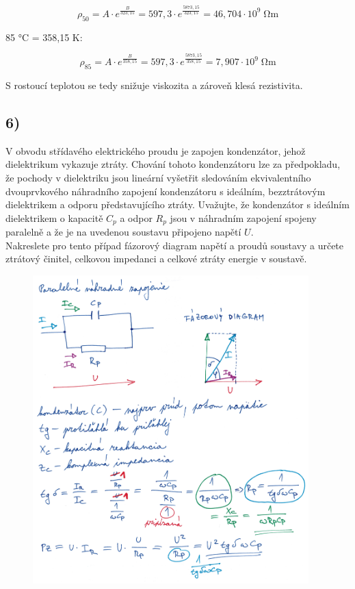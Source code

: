 \begin{equation*}
    \rho_{50} = A \cdot e^\frac{B}{323,15} = 597,3 \cdot e^\frac{5873,15}{323,15} = 46,704\cdot 10^9 \; \si{\ohm\meter}
\end{equation*}

85 \si{\celsius} = 358,15 \si{\kelvin}:

\begin{equation*}
    \rho_{85} = A \cdot e^\frac{B}{358,15} =  597,3 \cdot e^\frac{5873,15}{358,15} = 7,907 \cdot 10^9 \; \si{\ohm\meter}
\end{equation*}

S rostoucí teplotou se tedy snižuje viskozita a zároveň klesá rezistivita.

\newpage


\subsection*{6)}
V obvodu střídavého elektrického proudu je zapojen kondenzátor, jehož dielektrikum vykazuje ztráty. Chování tohoto kondenzátoru lze za předpokladu, že pochody v dielektriku jsou lineární vyšetřit sledováním ekvivalentního dvouprvkového náhradního zapojení kondenzátoru s ideálním, bezztrátovým dielektrikem a odporu představujícího ztráty. Uvažujte, že kondenzátor s ideálním dielektrikem o kapacitě $C_p$ a odpor $R_p$ jsou v náhradním zapojení spojeny paralelně a že je na uvedenou soustavu připojeno napětí $U$. \\
Nakreslete pro tento případ fázorový diagram napětí a proudů soustavy a určete ztrátový činitel, celkovou impedanci a celkové ztráty energie v soustavě.

\begin{figure}[h]
    \centering
    \includegraphics*[width=0.95\textwidth]{images/diel6.jpg}
\end{figure}

